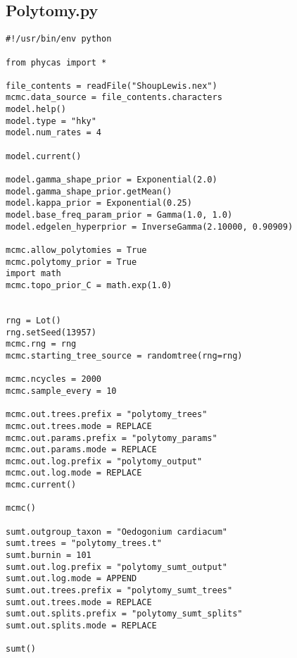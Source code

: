 \documentclass{article}
\begin{document}
\newpage
\subsection{Polytomy.py}\label{Polytomy}
\begin{verbatim}
#!/usr/bin/env python

from phycas import *

file_contents = readFile("ShoupLewis.nex")
mcmc.data_source = file_contents.characters
model.help()
model.type = "hky"
model.num_rates = 4

model.current()

model.gamma_shape_prior = Exponential(2.0)
model.gamma_shape_prior.getMean()
model.kappa_prior = Exponential(0.25)
model.base_freq_param_prior = Gamma(1.0, 1.0)
model.edgelen_hyperprior = InverseGamma(2.10000, 0.90909)

mcmc.allow_polytomies = True
mcmc.polytomy_prior = True
import math
mcmc.topo_prior_C = math.exp(1.0)


rng = Lot()
rng.setSeed(13957)
mcmc.rng = rng
mcmc.starting_tree_source = randomtree(rng=rng)

mcmc.ncycles = 2000
mcmc.sample_every = 10

mcmc.out.trees.prefix = "polytomy_trees"
mcmc.out.trees.mode = REPLACE 
mcmc.out.params.prefix = "polytomy_params"
mcmc.out.params.mode = REPLACE 
mcmc.out.log.prefix = "polytomy_output"
mcmc.out.log.mode = REPLACE 
mcmc.current()

mcmc()

sumt.outgroup_taxon = "Oedogonium cardiacum"
sumt.trees = "polytomy_trees.t" 
sumt.burnin = 101 
sumt.out.log.prefix = "polytomy_sumt_output"
sumt.out.log.mode = APPEND 
sumt.out.trees.prefix = "polytomy_sumt_trees"
sumt.out.trees.mode = REPLACE 
sumt.out.splits.prefix = "polytomy_sumt_splits"
sumt.out.splits.mode = REPLACE 

sumt()
\end{verbatim}


\newpage
\end{document}
